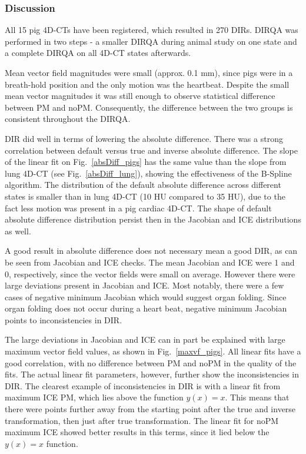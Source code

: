\subsubsection{Discussion}

All 15 pig 4D-CTs have been registered, which resulted in 270 DIRs. DIRQA was performed in two steps - a smaller DIRQA during animal study on one state and a complete DIRQA on all 4D-CT states afterwards.

Mean vector field magnitudes were small (approx. 0.1 mm), since pigs were in a breath-hold position and the only motion was the heartbeat. 
Despite the small mean vector magnitudes it was still enough to observe statistical difference between PM and noPM.
Consequently, the difference between the two groups is consistent throughout the DIRQA.

DIR did well in terms of lowering the absolute difference. There was a strong correlation between default versus true and inverse absolute difference. 
The slope of the linear fit on Fig.~\ref{absDiff_pigs} has the same value than the slope from lung 4D-CT (see Fig.~\ref{absDiff_lung}), showing
the effectiveness of the B-Spline algorithm. The distribution of the default absolute difference across different states is smaller than in lung 4D-CT (10 HU compared to 35 HU), due to the fact
less motion was present in a pig cardiac 4D-CT. The shape of default absolute difference
distribution persist then in the Jacobian and ICE distributions as well. 

A good result in absolute difference does not necessary mean a good DIR, as can be seen from Jacobian and ICE checks. The mean Jacobian and ICE were 1 and 0, respectively, since the
vector fields were small on average. However there were large deviations present in Jacobian and ICE. Most notably, there were a few cases of negative minimum Jacobian which would suggest 
organ folding. Since organ folding does not occur during a heart beat, negative minimum Jacobian points to inconsistencies in DIR. 

The large deviations in Jacobian and ICE can in part be explained with large maximum vector field values, as shown in Fig.~\ref{maxvf_pigs}. All linear fits have a good correlation, with no
difference between PM and noPM in the quality of the fits. The actual linear fit parameters, however, further show the inconsistencies in DIR. The clearest example of inconsistencies in
DIR is with a linear fit from maximum ICE PM, which lies above the function $y(x)=x$. This means that there were points further away from the starting point after the true and inverse transformation, 
then just after true transformation. The linear fit for noPM maximum ICE showed better results in this terms, since it lied below the $y(x)=x$ function.


